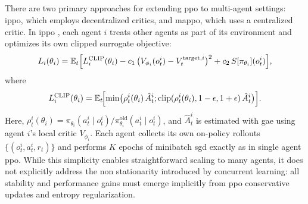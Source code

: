 
\subsection{}
There are two primary approaches for extending \gls{ppo} to multi-agent settings: \gls{ippo}, which employs decentralized critics, and \gls{mappo}, which uses a centralized critic.
In \gls{ippo} \cite{witt_is_2020}, each agent \(i\) treats other agents as part of its environment and optimizes its own clipped surrogate objective:
\begin{equation}
L_i(\theta_i) = \mathbb{E}_t\Bigl[L^{\mathrm{CLIP}}_i(\theta_i) 
  - c_1\,\bigl(V_{\phi_i}(o^i_t)-V^{\text{target},i}_t\bigr)^2 
  + c_2\,S[\pi_{\theta_i}](o^i_t)\Bigr],
\end{equation}
where
\begin{equation}
L^{\mathrm{CLIP}}_i(\theta_i) = \mathbb{E}_t\!\Bigl[\min\bigl(\rho^i_t(\theta_i)\,\hat{A}^i_t;\text{clip}(\rho^i_t(\theta_i),1-\epsilon,1+\epsilon)\,\hat{A}^i_t\bigr)\Bigr].
\end{equation}
Here, \(\rho^i_t(\theta_i)=\pi_{\theta_i}(a^i_t\mid o^i_t)/\pi_{\theta_i}^{\mathrm{old}}(a^i_t\mid o^i_t)\), and \(\hat{A}^i_t\) is estimated with \gls{gae} using agent \(i\)'s local critic \(V_{\phi_i}\). Each agent collects its own on-policy rollouts \(\{(o^i_t,a^i_t,r_t)\}\) and performs \(K\) epochs of minibatch \gls{sgd} exactly as in single agent \gls{ppo}.  While this simplicity enables straightforward scaling to many agents, it does not explicitly address the non stationarity introduced by concurrent learning: all stability and performance gains must emerge implicitly from \gls{ppo} conservative updates and entropy regularization. 

